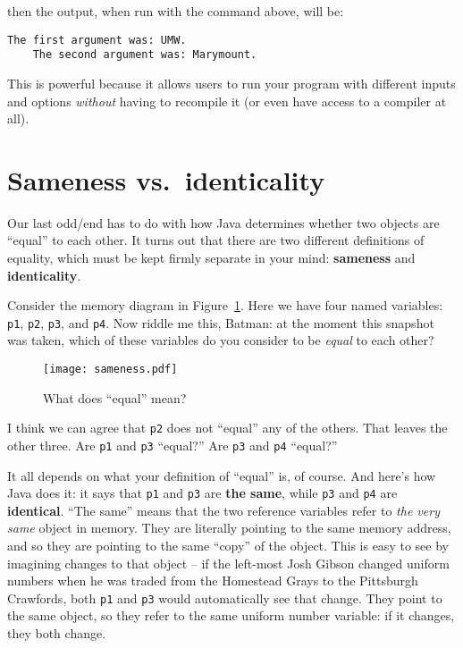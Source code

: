 then the output, when run with the command above, will be:

\begin{Verbatim}[fontsize=\small,samepage=true,frame=none]
    The first argument was: UMW.
    The second argument was: Marymount.
\end{Verbatim}

This is powerful because it allows users to run your program with different
inputs and options \textit{without} having to recompile it (or even have
access to a compiler at all).

\section{Sameness vs.~identicality}

Our last odd/end has to do with how Java determines whether two objects are
``equal'' to each other. It turns out that there are two different definitions
of equality, which must be kept firmly separate in your mind:
\textbf{sameness} and \textbf{identicality}.

Consider the memory diagram in Figure~\ref{fig:sameness}. Here we have four
named variables: \texttt{p1}, \texttt{p2}, \texttt{p3}, and \texttt{p4}. Now
riddle me this, Batman: at the moment this snapshot was taken, which of these
variables do you consider to be \textit{equal} to each other?

\begin{figure}[ht]
\centering
\texttt{[image: sameness.pdf]}
\caption{What does ``equal'' mean?}
\label{fig:sameness}
\end{figure}

I think we can agree that \texttt{p2} does not ``equal'' any of the others.
That leaves the other three. Are \texttt{p1} and \texttt{p3} ``equal?'' Are
\texttt{p3} and \texttt{p4} ``equal?''

It all depends on what your definition of ``equal'' is, of course. And here's
how Java does it: it says that \texttt{p1} and \texttt{p3} are \textbf{the
same}, while \texttt{p3} and \texttt{p4} are \textbf{identical}. ``The same''
means that the two reference variables refer to \textit{the very same} object
in memory. They are literally pointing to the same memory address, and so they
are pointing to the same ``copy'' of the object. This is easy to see by
imagining changes to that object -- if the left-most Josh Gibson changed
uniform numbers when he was traded from the Homestead Grays to the Pittsburgh
Crawfords, both \texttt{p1} and \texttt{p3} would automatically see that
change. They point to the same object, so they refer to the same uniform
number variable: if it changes, they both change.

